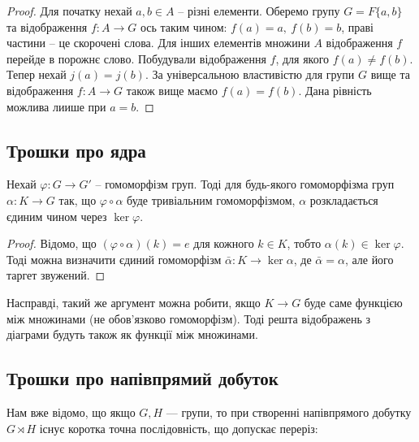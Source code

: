 \documentclass{math_library}
\begin{document}
\begin{proof}
Для початку нехай $a,b \in A$ -- різні елементи. Оберемо групу $G = F\{a,b\}$ та відображення $f \colon A \to G$ ось таким чином: $f(a) = a,\ f(b) = b$, праві частини -- це скорочені слова. Для інших елементів множини $A$ відображення $f$ перейде в порожнє слово. Побудували відображення $f$, для якого $f(a) \neq f(b)$.
\bigskip \\
Тепер нехай $j(a) = j(b)$. За універсальною властивістю для групи $G$ вище та відображення $f \colon A \to G$ також вище маємо $f(a) = f(b)$. Дана рівність можлива лиише при $a = b$.
\end{proof}

\subsection{Трошки про ядра}
\begin{proposition}
Нехай $\varphi \colon G \to G'$ -- гомоморфізм груп. Тоді для будь-якого гомоморфізма груп $\alpha \colon K \to G$ так, що $\varphi \circ \alpha$ буде тривіальним гомоморфізмом, $\alpha$ розкладається єдиним чином через $\ker \varphi$.
\begin{figure}[H]
\centering
{}
\end{figure}
\end{proposition}

\begin{proof}
Відомо, що $(\varphi \circ \alpha)(k) = e$ для кожного $k \in K$, тобто $\alpha(k) \in \ker \varphi$. Тоді можна визначити єдиний гомоморфізм $\bar{\alpha} \colon K \to \ker \alpha$, де $\bar{\alpha} = \alpha$, але його таргет звужений.
\end{proof}

\begin{remark}
Насправді, такий же аргумент можна робити, якщо $K \to G$ буде саме функцією між множинами (не обов'язково гомоморфізм). Тоді решта відображень з діаграми будуть також як функції між множинами.
\end{remark}

\subsection{Трошки про напівпрямий добуток}
Нам вже відомо, що якщо $G,H$ --- групи, то при створенні напівпрямого добутку $G \rtimes H$ існує коротка точна послідовність, що допускає переріз:
\begin{figure}[H]
\centering
{}
\end{figure}
\end{document}
